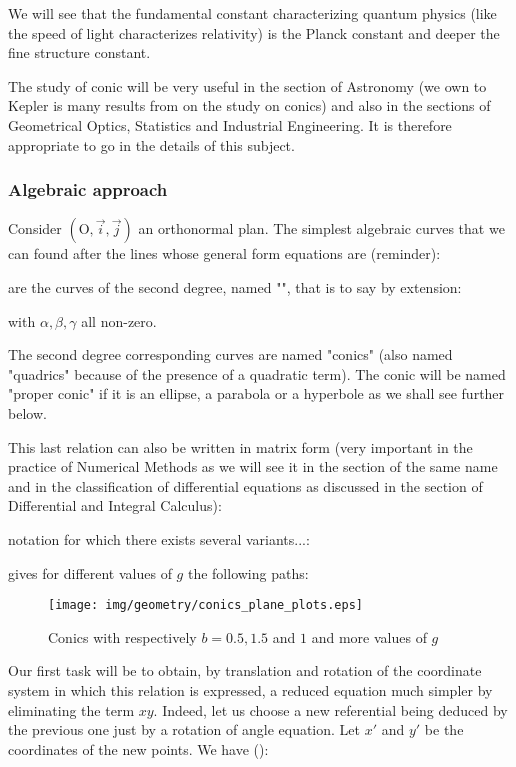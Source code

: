 	\begin{tcolorbox}[title=Remark,colframe=black,arc=10pt]
	We will see that the fundamental constant characterizing quantum physics (like the speed of light characterizes relativity) is the Planck constant and deeper the fine structure constant.
	\end{tcolorbox}	
	
	The study of conic will be very useful in the section of Astronomy (we own to Kepler is  many results from on the study on conics) and also in the sections of Geometrical Optics, Statistics and Industrial Engineering. It is therefore appropriate to go in the details of this subject.

	\subsubsection{Algebraic approach}
	Consider $(\text{O},\vec{i},\vec{j})$ an orthonormal plan. The simplest algebraic curves that we can found after the lines whose general form equations are (reminder):
	
are the curves of the second degree, named "", that is to say by extension:
	
with $\alpha,\beta,\gamma$ all non-zero.

	The second degree corresponding curves are named "conics" (also named "quadrics\label{quadrics}" because of the presence of a quadratic term). The conic will be named "proper conic" if it is an ellipse, a parabola or a hyperbole as we shall see further below.

This last relation can also be written in matrix form (very important in the practice of Numerical Methods as we will see it in the section of the same name and in the classification of differential equations as discussed in the section of Differential and Integral Calculus):
	
notation for which there exists several variants...:
	

	gives for different values of $g$ the following paths:
	\begin{figure}[H]
		\centering
		\texttt{[image: img/geometry/conics\_plane\_plots.eps]}
		\caption{Conics with respectively $b=0.5, 1.5$ and $1$ and more values of $g$}
	\end{figure}
	Our first task will be to obtain, by translation and rotation of the coordinate system in which this relation is expressed, a reduced equation much simpler by eliminating the term $xy$. Indeed, let us choose a new referential being deduced by the previous one just by a rotation of angle equation. Let $x'$ and $y'$ be the coordinates of the new points. We have ():
	
